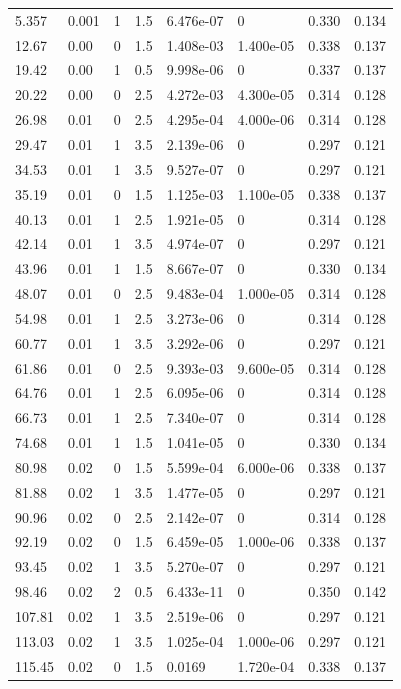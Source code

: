 \documentclass[preview]{standalone}
\begin{document}
{{\begin{tabular}{L{1.2cm}C{1.2cm} C{0.3cm}C{0.5cm} C{1.4cm}C{1.4cm} C{1.4cm}C{1.4cm}}
  5.357  &  0.001  & 1     & 1.5 &  6.476e-07  & 0  & 0.330 &  0.134   \\ 
  12.67  &  0.00  & 0     & 1.5 &  1.408e-03  & 1.400e-05  & 0.338 &  0.137   \\ 
  19.42  &  0.00  & 1     & 0.5 &  9.998e-06  & 0  & 0.337 &  0.137   \\ 
  20.22  &  0.00  & 0     & 2.5 &  4.272e-03  & 4.300e-05  & 0.314 &  0.128   \\ 
  26.98  &  0.01  & 0     & 2.5 &  4.295e-04  & 4.000e-06  & 0.314 &  0.128   \\ 
  29.47  &  0.01  & 1     & 3.5 &  2.139e-06  & 0  & 0.297 &  0.121   \\ 
  34.53  &  0.01  & 1     & 3.5 &  9.527e-07  & 0  & 0.297 &  0.121   \\ 
  35.19  &  0.01  & 0     & 1.5 &  1.125e-03  & 1.100e-05  & 0.338 &  0.137   \\ 
  40.13  &  0.01  & 1     & 2.5 &  1.921e-05  & 0  & 0.314 &  0.128   \\ 
  42.14  &  0.01  & 1     & 3.5 &  4.974e-07  & 0  & 0.297 &  0.121   \\ 
  43.96  &  0.01  & 1     & 1.5 &  8.667e-07  & 0  & 0.330 &  0.134   \\ 
  48.07  &  0.01  & 0     & 2.5 &  9.483e-04  & 1.000e-05  & 0.314 &  0.128   \\ 
  54.98  &  0.01  & 1     & 2.5 &  3.273e-06  & 0  & 0.314 &  0.128   \\ 
  60.77  &  0.01  & 1     & 3.5 &  3.292e-06  & 0  & 0.297 &  0.121   \\ 
  61.86  &  0.01  & 0     & 2.5 &  9.393e-03  & 9.600e-05  & 0.314 &  0.128   \\ 
  64.76  &  0.01  & 1     & 2.5 &  6.095e-06  & 0  & 0.314 &  0.128   \\ 
  66.73  &  0.01  & 1     & 2.5 &  7.340e-07  & 0  & 0.314 &  0.128   \\ 
  74.68  &  0.01  & 1     & 1.5 &  1.041e-05  & 0  & 0.330 &  0.134   \\ 
  80.98  &  0.02  & 0     & 1.5 &  5.599e-04  & 6.000e-06  & 0.338 &  0.137   \\ 
  81.88  &  0.02  & 1     & 3.5 &  1.477e-05  & 0  & 0.297 &  0.121   \\ 
  90.96  &  0.02  & 0     & 2.5 &  2.142e-07  & 0  & 0.314 &  0.128   \\ 
  92.19  &  0.02  & 0     & 1.5 &  6.459e-05  & 1.000e-06  & 0.338 &  0.137   \\ 
  93.45  &  0.02  & 1     & 3.5 &  5.270e-07  & 0  & 0.297 &  0.121   \\ 
  98.46  &  0.02  & 2     & 0.5 &  6.433e-11  & 0  & 0.350 &  0.142   \\ 
  107.81  &  0.02  & 1     & 3.5 &  2.519e-06  & 0  & 0.297 &  0.121   \\ 
  113.03  &  0.02  & 1     & 3.5 &  1.025e-04  & 1.000e-06  & 0.297 &  0.121   \\ 
  115.45  &  0.02  & 0     & 1.5 &  0.0169  & 1.720e-04  & 0.338 &  0.137   \\ 
\hline 
\end{tabular} 

}}
\end{document}
